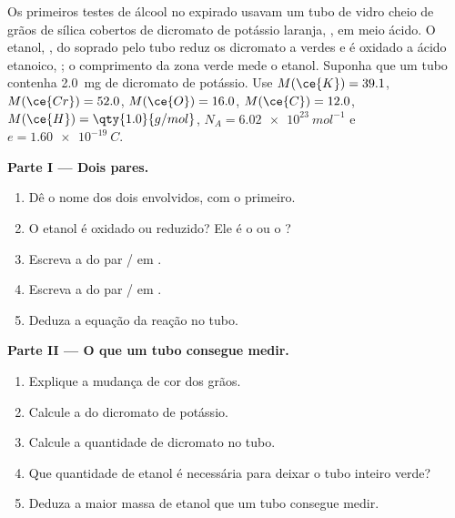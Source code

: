 \begin{problem}
\label{pb:g11:redox:1}
Os primeiros testes de álcool no  expirado usavam um tubo de vidro
cheio de grãos de sílica cobertos de dicromato de potássio laranja,
, em meio ácido. O etanol, , do  soprado pelo
tubo reduz os  dicromato a   verdes e é oxidado a
ácido etanoico, ; o comprimento da zona verde mede o etanol.
Suponha que um tubo contenha \qty{2.0}{mg} de dicromato de potássio. Use
$M(\ce{K}) = 39.1$, $M(\ce{Cr}) = 52.0$, $M(\ce{O}) = 16.0$,
$M(\ce{C}) = 12.0$, $M(\ce{H}) = \qty{1.0}{g/mol}$, $N_A =
\qty{6.02e23}{mol^{-1}}$ e $e = \qty{1.60e-19}{C}$.

\medskip
\noindent\textbf{Parte I --- Dois pares.}
\begin{enumerate}
  \item Dê o nome dos dois  envolvidos, com o 
        primeiro.
  \item O etanol é oxidado ou reduzido? Ele é o  ou o ?
  \item Escreva a  do par / em
        .
  \item Escreva a  do par / em
        .
  \item Deduza a equação da reação no tubo.
\end{enumerate}

\medskip
\noindent\textbf{Parte II --- O que um tubo consegue medir.}
\begin{enumerate}[resume]
  \item Explique a mudança de cor dos grãos.
  \item Calcule a  do dicromato de potássio.
  \item Calcule a quantidade de  dicromato no tubo.
  \item Que quantidade de etanol é necessária para deixar o tubo
        inteiro verde?
  \item Deduza a maior massa de etanol que um tubo consegue medir.
\end{enumerate}


\end{problem}
